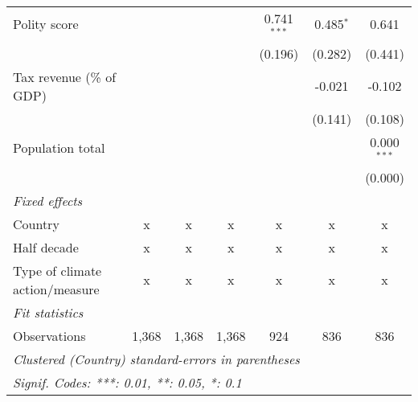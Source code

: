 \begin{tabular}{lcccccc}
   Polity score                                                            &         &         &               & 0.741$^{***}$  & 0.485$^{*}$   & 0.641\\   
                                                                           &         &         &               & (0.196)        & (0.282)       & (0.441)\\   
   Tax revenue (\% of GDP)                                                 &         &         &               &                & -0.021        & -0.102\\   
                                                                           &         &         &               &                & (0.141)       & (0.108)\\   
   Population total                                                        &         &         &               &                &               & 0.000$^{***}$\\   
                                                                           &         &         &               &                &               & (0.000)\\   
   \emph{Fixed effects}\\
   Country                                                                 & x       & x       & x             & x              & x             & x\\  
   Half decade                                                             & x       & x       & x             & x              & x             & x\\  
   Type of climate action/measure                                          & x       & x       & x             & x              & x             & x\\  
   \midrule \emph{Fit statistics}\\
   Observations                                                            & 1,368   & 1,368   & 1,368         & 924            & 836           & 836\\  
   \midrule
   \multicolumn{7}{l}{\emph{Clustered (Country) standard-errors in parentheses}}\\
   \multicolumn{7}{l}{\emph{Signif. Codes: ***: 0.01, **: 0.05, *: 0.1}}\\
\end{tabular}
\par\endgroup


